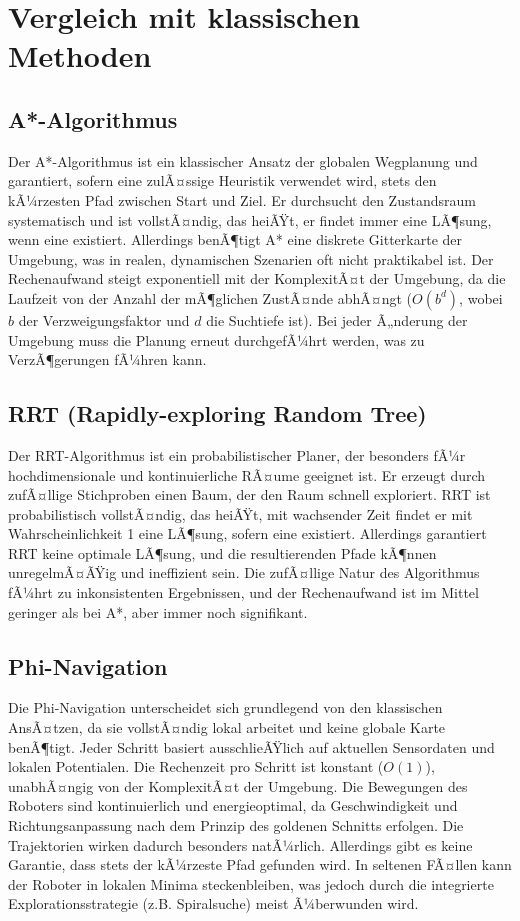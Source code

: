 ﻿\documentclass[a4paper,12pt]{article}
\theoremstyle{definition}
\begin{document}
\section{Vergleich mit klassischen Methoden}

\subsection{A*-Algorithmus}

Der A*-Algorithmus ist ein klassischer Ansatz der globalen Wegplanung und garantiert, sofern eine zulÃ¤ssige Heuristik verwendet wird, stets den kÃ¼rzesten Pfad zwischen Start und Ziel. Er durchsucht den Zustandsraum systematisch und ist vollstÃ¤ndig, das heiÃŸt, er findet immer eine LÃ¶sung, wenn eine existiert. Allerdings benÃ¶tigt A* eine diskrete Gitterkarte der Umgebung, was in realen, dynamischen Szenarien oft nicht praktikabel ist. Der Rechenaufwand steigt exponentiell mit der KomplexitÃ¤t der Umgebung, da die Laufzeit von der Anzahl der mÃ¶glichen ZustÃ¤nde abhÃ¤ngt ($O(b^d)$, wobei $b$ der Verzweigungsfaktor und $d$ die Suchtiefe ist). Bei jeder Ã„nderung der Umgebung muss die Planung erneut durchgefÃ¼hrt werden, was zu VerzÃ¶gerungen fÃ¼hren kann.

\subsection{RRT (Rapidly-exploring Random Tree)}

Der RRT-Algorithmus ist ein probabilistischer Planer, der besonders fÃ¼r hochdimensionale und kontinuierliche RÃ¤ume geeignet ist. Er erzeugt durch zufÃ¤llige Stichproben einen Baum, der den Raum schnell exploriert. RRT ist probabilistisch vollstÃ¤ndig, das heiÃŸt, mit wachsender Zeit findet er mit Wahrscheinlichkeit 1 eine LÃ¶sung, sofern eine existiert. Allerdings garantiert RRT keine optimale LÃ¶sung, und die resultierenden Pfade kÃ¶nnen unregelmÃ¤ÃŸig und ineffizient sein. Die zufÃ¤llige Natur des Algorithmus fÃ¼hrt zu inkonsistenten Ergebnissen, und der Rechenaufwand ist im Mittel geringer als bei A*, aber immer noch signifikant.

\subsection{Phi-Navigation}

Die Phi-Navigation unterscheidet sich grundlegend von den klassischen AnsÃ¤tzen, da sie vollstÃ¤ndig lokal arbeitet und keine globale Karte benÃ¶tigt. Jeder Schritt basiert ausschlieÃŸlich auf aktuellen Sensordaten und lokalen Potentialen. Die Rechenzeit pro Schritt ist konstant ($O(1)$), unabhÃ¤ngig von der KomplexitÃ¤t der Umgebung. Die Bewegungen des Roboters sind kontinuierlich und energieoptimal, da Geschwindigkeit und Richtungsanpassung nach dem Prinzip des goldenen Schnitts erfolgen. Die Trajektorien wirken dadurch besonders natÃ¼rlich. Allerdings gibt es keine Garantie, dass stets der kÃ¼rzeste Pfad gefunden wird. In seltenen FÃ¤llen kann der Roboter in lokalen Minima steckenbleiben, was jedoch durch die integrierte Explorationsstrategie (z.B. Spiralsuche) meist Ã¼berwunden wird.
\end{document}
